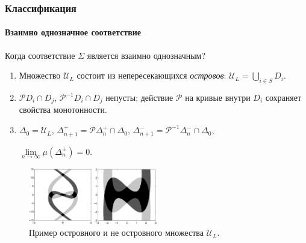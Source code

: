 \documentclass [10pt] {beamer}
\begin{document}
\begin{frame}
	\frametitle{Классификация}
	\framesubtitle{Взаимно однозначное соответствие}
	
	Когда соответствие $\Sigma$ является взаимно однозначным?\footnotemark[3]
	\begin{enumerate}
		\item Множество $\mathscr{U}_L$ состоит из непересекающихся {\it островов}: $\mathscr{U}_L = \bigcup_{i \in S} D_i$.
		\item $\mathcal{P} D_i \cap D_j$, $\mathcal{P}^{-1} D_i \cap D_j$ непусты; действие $\mathcal{P}$ на кривые внутри $D_i$ сохраняет свойства монотонности.
		\item $\Delta_0 = \mathscr{U}_L$, \quad $\Delta_{n + 1}^+ = \mathcal{P} \Delta_n^+ \cap \Delta_0$, \quad $\Delta_{n + 1}^- = \mathcal{P}^{-1} \Delta_n^- \cap \Delta_0$,\begin{center}
				$\lim \limits_{n \to \infty} \mu( \Delta_n^{\pm} ) = 0$.
			\end{center} 
	\end{enumerate}
	
	\begin{figure}
		\includegraphics[width=0.5\textwidth]{pic/islands.pdf}
		\caption{Пример островного и не островного множества $\mathscr{U}_{L}$.}
		\label{pic:coding}
	\end{figure}
	
\end{frame}
\end{document}
